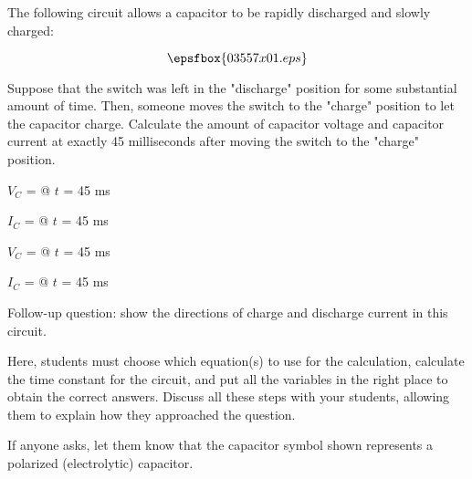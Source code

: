 

The following circuit allows a capacitor to be rapidly discharged and slowly charged:

$$\epsfbox{03557x01.eps}$$

Suppose that the switch was left in the "discharge" position for some substantial amount of time.  Then, someone moves the switch to the "charge" position to let the capacitor charge.  Calculate the amount of capacitor voltage and capacitor current at exactly 45 milliseconds after moving the switch to the "charge" position.

\vskip 10pt

$V_C$ = \underbar{\hskip 70pt} @ $t$ = 45 ms

\vskip 10pt

$I_C$ = \underbar{\hskip 70pt} @ $t$ = 45 ms







$V_C$ =  @ $t$ = 45 ms

\vskip 10pt

$I_C$ =  @ $t$ = 45 ms

\vskip 10pt

Follow-up question: show the directions of charge and discharge current in this circuit.







Here, students must choose which equation(s) to use for the calculation, calculate the time constant for the circuit, and put all the variables in the right place to obtain the correct answers.  Discuss all these steps with your students, allowing them to explain how they approached the question.

If anyone asks, let them know that the capacitor symbol shown represents a polarized (electrolytic) capacitor.




